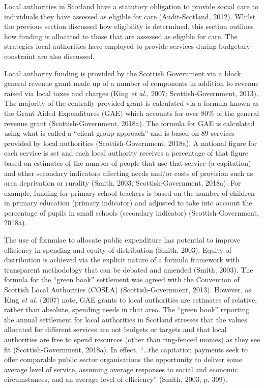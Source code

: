 \documentclass[12pt,a4paper,oneside,table]{report}
\begin{document}
Local authorities in Scotland have a statutory obligation to provide
social care to individuals they have assessed as eligible for care
(Audit-Scotland, 2012). Whilst the previous section discussed how
eligibility is determined, this section outlines how funding is
allocated to those that are assessed as eligible for care. The
strategies local authorities have employed to provide services during
budgetary constraint are also discussed.

Local authority funding is provided by the Scottish Government via a
block general revenue grant made up of a number of components in
addition to revenue raised via local taxes and charges (King \emph{et
al.}, 2007; Scottish-Government, 2013). The majority of the
centrally-provided grant is calculated via a formula known as the Grant
Aided Expenditures (GAE) which accounts for over 80\% of the general
revenue grant (Scottish-Government, 2018a). The formula for GAE is
calculated using what is called a ``client group approach'' and is based
on 89 services provided by local authorities (Scottish-Government,
2018a). A national figure for each service is set and each local
authority receives a percentage of that figure based on estimates of the
number of people that use that service (a capitation) and other
secondary indicators affecting needs and/or costs of provision such as
area deprivation or rurality (Smith, 2003; Scottish-Government, 2018a).
For example, funding for primary school teachers is based on the number
of children in primary education (primary indicator) and adjusted to
take into account the percentage of pupils in small schools (secondary
indicator) (Scottish-Government, 2018a).

The use of formulae to allocate public expenditure has potential to
improve efficiency in spending and equity of distribution (Smith, 2003).
Equity of distribution is achieved via the explicit nature of a formula
framework with transparent methodology that can be debated and amended
(Smith, 2003). The formula for the ``green book'' settlement was agreed
with the Convention of Scottish Local Authorities (COSLA)
(Scottish-Government, 2013). However, as King \textit{et al.} (2007)
note, GAE grants to local authorities are estimates of relative, rather
than absolute, spending needs in that area. The ``green book'' reporting
the annual settlement for local authorities in Scotland stresses that
the values allocated for different services are not budgets or targets
and that local authorities are free to spend resources (other than
ring-fenced monies) as they see fit (Scottish-Government, 2018a). In
effect, ``\ldots{}the capitation payments seek to offer comparable
public sector organisations the opportunity to deliver some average
level of service, assuming average responses to social and economic
circumstances, and an average level of efficiency'' (Smith, 2003, p.
309).
\end{document}
